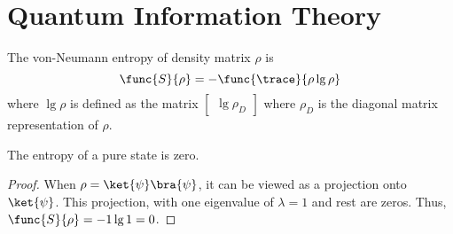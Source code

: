 \chapter{Quantum Information Theory}
The von-Neumann entropy of density matrix \(\rho\) is 
\begin{equation*}
    \func{S}{\rho} = - \func{\trace}{\rho \lg \rho}
\end{equation*}
where \(\lg \rho\) is defined as the matrix \(\begin{bmatrix}
    \lg \rho_D
\end{bmatrix}\)
where \(\rho_D\) is the diagonal matrix representation of \(\rho\).

\begin{proposition}
    The entropy of a pure state is zero.
\end{proposition}
\begin{proof}
    When \(\rho = \ket{\psi}\bra{\psi}\), it can be viewed as a projection onto \(\ket{\psi}\). This projection, with one eigenvalue of \(\lambda = 1\) and rest are zeros. Thus, \(\func{S}{\rho} = - 1 \lg 1 = 0\).
\end{proof}